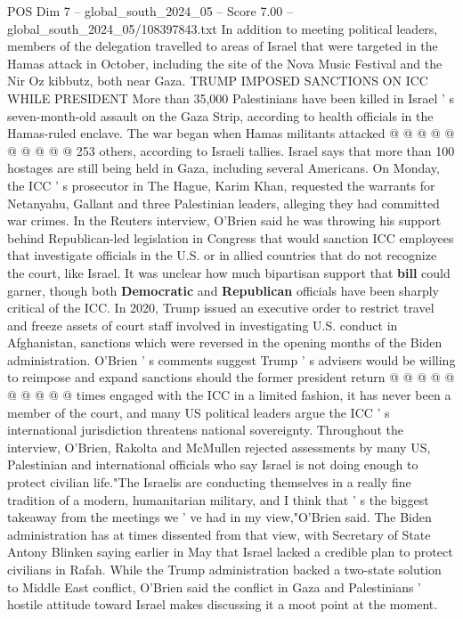 \begin{textsample}{POS Dim 7 – global\_south\_2024\_05 – Score 7.00 – global\_south\_2024\_05/108397843.txt}
In addition to meeting political leaders, members of the delegation travelled to areas of Israel that were targeted in the Hamas attack in October, including the site of the Nova Music Festival and the Nir Oz kibbutz, both near Gaza.
TRUMP IMPOSED SANCTIONS ON ICC WHILE PRESIDENT More than 35,000 Palestinians have been killed in Israel ' s seven-month-old assault on the Gaza Strip, according to health officials in the Hamas-ruled enclave.
The war began when Hamas militants attacked @ @ @ @ @ @ @ @ @ @ 253 others, according to Israeli tallies.
Israel says that more than 100 hostages are still being held in Gaza, including several Americans.
On Monday, the ICC ' s prosecutor in The Hague, Karim Khan, requested the warrants for Netanyahu, Gallant and three Palestinian leaders, alleging they had committed war crimes.
In the Reuters interview, O'Brien said he was throwing his support behind Republican-led legislation in Congress that would sanction ICC employees that investigate officials in the U.S. or in allied countries that do not recognize the court, like Israel.
It was unclear how much bipartisan support that \textbf{bill} could garner, though both \textbf{Democratic} and \textbf{Republican} officials have been sharply critical of the ICC.
In 2020, Trump issued an executive order to restrict travel and freeze assets of court staff involved in investigating U.S. conduct in Afghanistan, sanctions which were reversed in the opening months of the Biden administration.
O'Brien ' s comments suggest Trump ' s advisers would be willing to reimpose and expand sanctions should the former president return @ @ @ @ @ @ @ @ @ @ times engaged with the ICC in a limited fashion, it has never been a member of the court, and many US political leaders argue the ICC ' s international jurisdiction threatens national sovereignty.
Throughout the interview, O'Brien, Rakolta and McMullen rejected assessments by many US, Palestinian and international officials who say Israel is not doing enough to protect civilian life."The Israelis are conducting themselves in a really fine tradition of a modern, humanitarian military, and I think that ' s the biggest takeaway from the meetings we ' ve had in my view,"O'Brien said.
The Biden administration has at times dissented from that view, with Secretary of State Antony Blinken saying earlier in May that Israel lacked a credible plan to protect civilians in Rafah.
While the Trump administration backed a two-state solution to Middle East conflict, O'Brien said the conflict in Gaza and Palestinians ' hostile attitude toward Israel makes discussing it a moot point at the moment.

\end{textsample}
